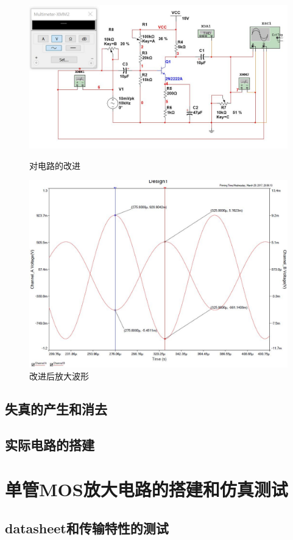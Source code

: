 \documentclass[UTF8,a4paper]{ctexart}
\begin{document}
\begin{figure}
\centering
\includegraphics[width=\textwidth]{1-3Ac.jpg}
\caption{对电路的改进}
\label{bjtc1}
\includegraphics[width=\textwidth]{1-3AA.jpg}
\caption{改进后放大波形}
\label{bjtA1}
\end{figure}
\subsection{失真的产生和消去}

\subsection{实际电路的搭建}
\section{单管MOS放大电路的搭建和仿真测试}
\subsection{datasheet和传输特性的测试}
\end{document}
